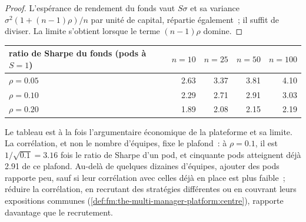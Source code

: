 \begin{proof}
L'espérance de rendement du fonds vaut $S\sigma$ et sa variance $\sigma^2(1+(n-1)\rho)/n$ par unité de capital, répartie également~; il suffit de diviser. La limite s'obtient
lorsque le terme $(n-1)\rho$ domine.
\end{proof}

\begin{center}
\small
\begin{tabular}{@{}lrrrr@{}}
\toprule
ratio de Sharpe du fonds (pods à $S=1$) & $n=10$ & $n=25$ & $n=50$ & $n=100$\\
\midrule
$\rho=0.05$ & 2.63 & 3.37 & 3.81 & 4.10\\
$\rho=0.10$ & 2.29 & 2.71 & 2.91 & 3.03\\
$\rho=0.20$ & 1.89 & 2.08 & 2.15 & 2.19\\
\bottomrule
\end{tabular}
\end{center}

Le tableau est à la fois l'argumentaire économique de la plateforme et sa limite. La corrélation, et non le nombre d'équipes, fixe le plafond~: à $\rho=0.1$, il est
$1/\sqrt{0.1}=3.16$ fois le ratio de Sharpe d'un pod, et cinquante pods atteignent déjà 2.91 de ce plafond. Au-delà de quelques dizaines d'équipes, ajouter des pods rapporte peu, sauf
si leur corrélation avec celles déjà en place est plus faible~; réduire la corrélation, en recrutant des stratégies différentes ou en couvrant leurs expositions communes
(\cref{def:fm:the-multi-manager-platform:centre}), rapporte davantage que le recrutement.

